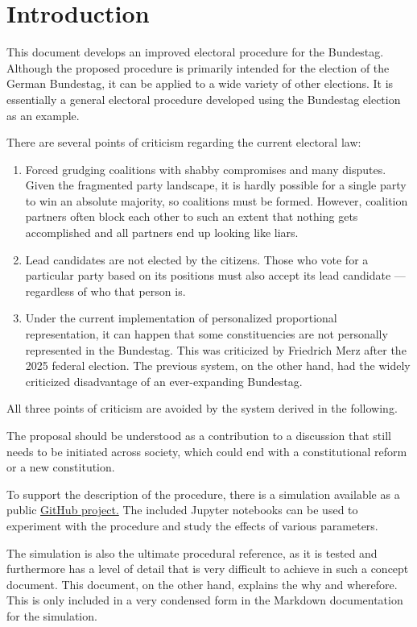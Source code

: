 \section{Introduction}

This document develops an improved electoral procedure for the Bundestag. Although
the proposed procedure is primarily intended for the election of the German Bundestag, it can
be applied to a wide variety of other elections. It is essentially a general
electoral procedure developed using the Bundestag election as an example.

There are several points of criticism regarding the current electoral law:
\begin{enumerate}
  \item Forced grudging coalitions with shabby compromises and many disputes.
    Given the fragmented party landscape, it is hardly possible for a single party to win an absolute
    majority, so coalitions must be formed. However, coalition partners often block each other
    to such an extent that nothing gets accomplished and all partners end up looking like liars.

  \item Lead candidates are not elected by the citizens. Those who vote for a particular party based on
    its positions must also accept its lead candidate --- regardless of who that person is.

  \item Under the current implementation of personalized proportional representation, it can
    happen that some constituencies are not personally represented in the Bundestag. This was
    criticized by Friedrich Merz after the 2025 federal election. The previous system, on the other hand,
    had the widely criticized disadvantage of an ever-expanding Bundestag.
\end{enumerate}

All three points of criticism are avoided by the system derived in the following.

The proposal should be understood as a contribution to a discussion that still needs to be initiated
across society, which could end with a constitutional reform or a new constitution.

To support the description of the procedure, there is a simulation available as a public
\href{https://github.com/danielschwalbe/ipres}{GitHub project.} The included Jupyter notebooks
can be used to experiment with the procedure and study the effects
of various parameters.

The simulation is also the ultimate procedural reference, as it is tested and furthermore
has a level of detail that is very difficult to achieve in such a concept document. This document, on the other hand, explains the why and wherefore. This is only included in a very
condensed form in the Markdown documentation for the simulation.
